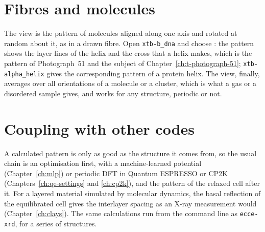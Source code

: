 \section{Fibres and molecules}
The  view is the pattern of molecules aligned along one axis and rotated at random about it, as in a drawn fibre. Open \texttt{xtb-b\_dna} and choose : the pattern shows the layer lines of the helix and the cross that a helix makes, which is the pattern of Photograph~51 and the subject of Chapter~\ref{ch:t-photograph-51}; \texttt{xtb-alpha\_helix} gives the corresponding pattern of a protein helix. The  view, finally, averages over all orientations of a molecule or a cluster, which is what a gas or a disordered sample gives, and works for any structure, periodic or not.

\section{Coupling with other codes}
A calculated pattern is only as good as the structure it comes from, so the usual chain is an optimisation first, with a machine-learned potential (Chapter~\ref{ch:mlp}) or periodic DFT in Quantum ESPRESSO or CP2K (Chapters~\ref{ch:qe-settings} and \ref{ch:cp2k}), and the pattern of the relaxed cell after it. For a layered material simulated by molecular dynamics, the basal reflection of the equilibrated cell gives the interlayer spacing as an X-ray measurement would (Chapter~\ref{ch:clays}). The same calculations run from the command line as \texttt{ecce-xrd}, for a series of structures.
